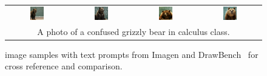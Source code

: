 \begin{figure}[ht!]
\begin{tabular}{cccc}
        \includegraphics[width=0.24\textwidth]{figures/cross/math_0.jpg} &
        \includegraphics[width=0.24\textwidth]{figures/cross/math_1.jpg} &
        \includegraphics[width=0.24\textwidth]{figures/cross/math_2.jpg} &
        \includegraphics[width=0.24\textwidth]{figures/cross/math_3.jpg} \vspace{-1mm}\\
        \multicolumn{4}{c}{\small A photo of a confused grizzly bear in calculus class.}\\
    \end{tabular} 
    \caption{\bdraw image samples with text prompts from Imagen and DrawBench~\cite{imagen} for cross reference and comparison.}
    \label{figs:cross_reference_4}
    \vskip -0.2in
\end{figure}